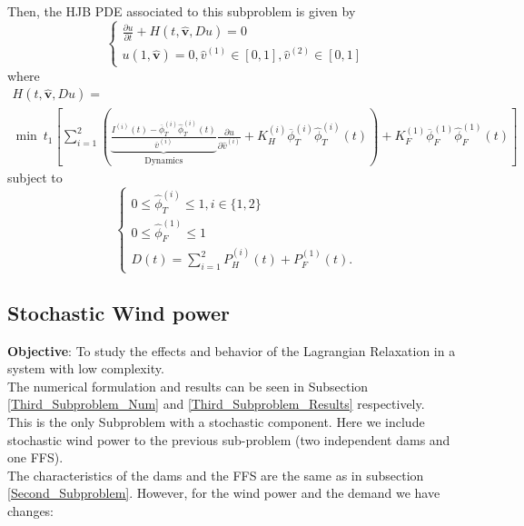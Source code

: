Then, the HJB PDE associated to this subproblem is given by
\begin{equation}
\begin{cases}
\frac{\partial u}{\partial t}+H(t,\hat{\bm{v}},Du)=0\\
u(1,\hat{\bm{v}})=0,\hat{v}^{(1)}\in[0,1],\hat{v}^{(2)}\in[0,1]
\end{cases}
\end{equation}
where
\begin{multline}
H(t,\hat{\bm{v}},Du)=\\
\min\ t_1\left[\sum_{i=1}^2\left(\underbrace{\frac{I^{(i)}(t)-\overline{\phi}_T^{(i)}\hat{\phi}_T^{(i)}(t)}{\overline{v}^{(i)}}}_{\text{Dynamics}}\frac{\partial u}{\partial \hat{v}^{(i)}}+K_H^{(i)}\overline{\phi}_T^{(i)}\hat{\phi}_T^{(i)}(t)\right)+K_F^{(1)}\overline{\phi}_F^{(1)}\hat{\phi}_F^{(1)}(t)\right]
\label{Hamiltonian_2}
\end{multline}
subject to
\begin{equation}
\begin{cases}
0\leq\hat{\phi}^{(i)}_T\leq1,i\in\{1,2\}\\
0\leq\hat{\phi}^{(1)}_F\leq1\\
D(t)=\sum_{i=1}^2P_H^{(i)}(t)+P_F^{(1)}(t).
\end{cases}
\end{equation}

\subsection{Stochastic Wind power} \label{Third_Subproblem}

\textbf{Objective}: To study the effects and behavior of the Lagrangian Relaxation in a system with low complexity.\\

The numerical formulation and results can be seen in Subsection \ref{Third_Subproblem_Num} and \ref{Third_Subproblem_Results} respectively.\\

This is the only Subproblem with a stochastic component. Here we include stochastic wind power to the previous sub-problem (two independent dams and one FFS).\\
The characteristics of the dams and the FFS are the same as in subsection \ref{Second_Subproblem}. However, for the wind power and the demand we have changes:

